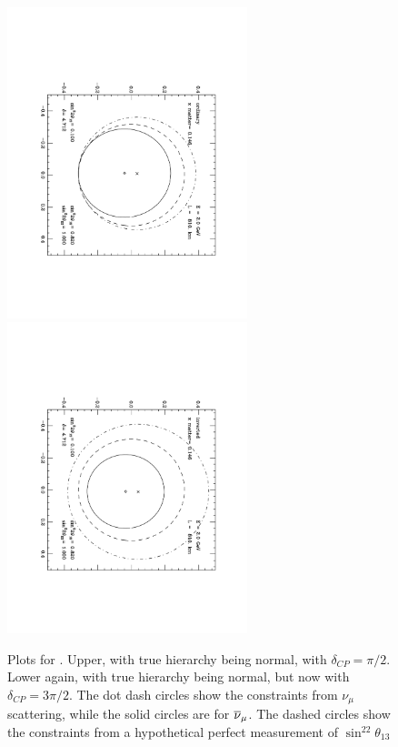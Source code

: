 \begin{figure}
\begin{center}
\includegraphics[width=2.75in,angle=90]{RNC/cpv_nova_threepibytwo.pdf}
\includegraphics[width=2.75in,angle=90]{RNC/cpv_nova_threepibytwo_inv.pdf}
\caption{Plots for \NOvA.  Upper, with true hierarchy being normal, with $\delta_{CP}=\pi/2$.  Lower again,  with true hierarchy being normal, but now with $\delta_{CP}=3\pi/2$. The dot dash circles show the constraints from $\nu_\mu$ scattering, while the solid circles are for $\overline\nu_\mu$. The dashed circles show the constraints from a hypothetical perfect measurement of $\sin^22\theta_{13}$\label{fig_two}}
\end{center}
\end{figure}
\clearpage

